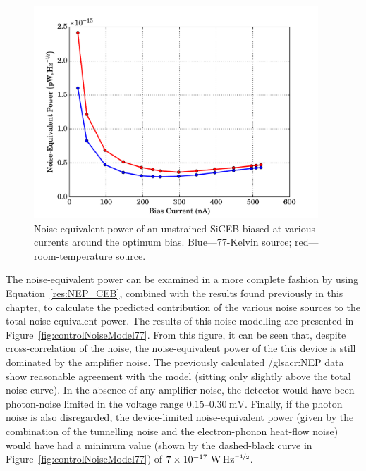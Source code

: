 \begin{figure}[tb]
\begin{center}
\includegraphics[width = 0.95\textwidth]{figures/control_NEP_77_300}
\caption[Noise-equivalent power of an unstrained-SiCEB biased at various currents around the optimum bias]{Noise-equivalent power of an unstrained-SiCEB biased at various currents around the optimum bias. Blue---77-Kelvin source; red---room-temperature source.}
\label{fig:controlNoiseNEP}
\end{center}
\end{figure}
\par 
The noise-equivalent power can be examined in a more complete fashion by using Equation~\ref{res:NEP_CEB}, combined with the results found previously in this chapter, to calculate the predicted contribution of the various noise sources to the total noise-equivalent power. The results of this noise modelling are presented in Figure~\ref{fig:controlNoiseModel77}. From this figure, it can be seen that, despite cross-correlation of the noise, the noise-equivalent power of the this device is still dominated by the amplifier noise. The previously calculated /gls{acr:NEP} data show reasonable agreement with the model (sitting only slightly above the total noise curve). In the absence of any amplifier noise, the detector would have been photon-noise limited in the voltage range $0.15\mbox{--}0.30~\mathrm{mV}$. Finally, if the photon noise is also disregarded, the device-limited noise-equivalent power (given by the combination of the tunnelling noise and the electron-phonon heat-flow noise) would have had a minimum value (shown by the dashed-black curve in Figure~\ref{fig:controlNoiseModel77}) of $7 \times 10^{-17}~\mathrm{W\,Hz^{\nicefrac{-1}{2}}}$.
